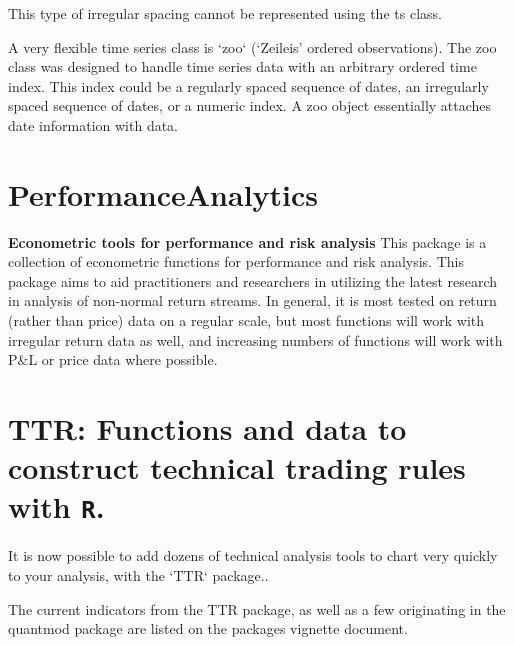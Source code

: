 \documentclass[]{article}
\begin{document}
This type of irregular spacing cannot be represented using the ts class.

A very flexible time series class is `zoo` (`Zeileis' ordered observations). The zoo class was designed to handle
time series data with an arbitrary ordered time index. This index could be a regularly spaced sequence of
dates, an irregularly spaced sequence of dates, or a numeric index. A zoo object essentially attaches
date information with data.

\section{PerformanceAnalytics}
\textbf{Econometric tools for performance and risk analysis}
This package is a collection of econometric functions for performance and risk analysis. This package aims to aid practitioners and researchers in utilizing the latest research in analysis of non-normal return streams. In general, it is most tested on return (rather than price) data on a regular scale, but most functions will work with irregular return data as well, and increasing numbers of functions will work with P$\&$L or price data where possible.

\section{TTR: Functions and data to construct technical trading rules with \texttt{R}.}

It is now possible to add dozens of technical analysis tools to chart very quickly to your analysis, with the `TTR` package..

The current indicators from the TTR package, as well as a few originating in the quantmod package are listed on the packages vignette document.
\end{document}
